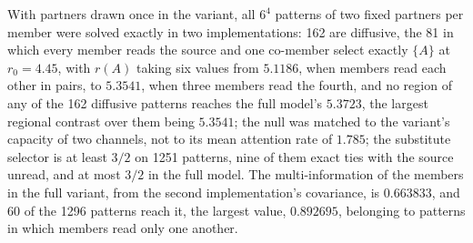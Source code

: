 \begin{numcheck}
With partners drawn once in the variant, all $6^4$ patterns of two fixed partners per member were solved exactly in two implementations: 162 are diffusive, the 81 in which every member reads the source and one co-member select exactly $\{A\}$ at $r_0=4.45$, with $r(A)$ taking six values from $5.1186$, when members read each other in pairs, to $5.3541$, when three members read the fourth, and no region of any of the 162 diffusive patterns reaches the full model's $5.3723$, the largest regional contrast over them being $5.3541$; the null was matched to the variant's capacity of two channels, not to its mean attention rate of $1.785$; the substitute selector is at least $3/2$ on 1251 patterns, nine of them exact ties with the source unread, and at most $3/2$ in the full model. The multi-information of the members in the full variant, from the second implementation's covariance, is $0.663833$, and 60 of the 1296 patterns reach it, the largest value, $0.892695$, belonging to patterns in which members read only one another.
\end{numcheck}
